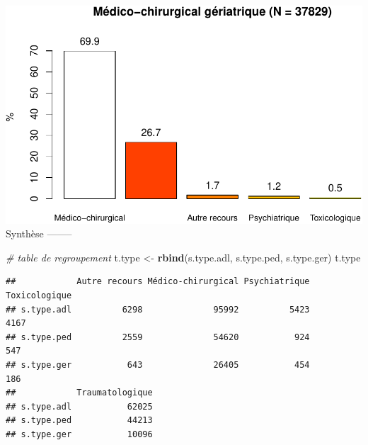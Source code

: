 \documentclass[]{article}
\newenvironment{Shaded}{\begin{snugshade}}{\end{snugshade}}
\newcommand{\KeywordTok}[1]{\textcolor[rgb]{0.13,0.29,0.53}{\textbf{{#1}}}}
\newcommand{\DataTypeTok}[1]{\textcolor[rgb]{0.13,0.29,0.53}{{#1}}}
\newcommand{\FloatTok}[1]{\textcolor[rgb]{0.00,0.00,0.81}{{#1}}}
\newcommand{\StringTok}[1]{\textcolor[rgb]{0.31,0.60,0.02}{{#1}}}
\newcommand{\CommentTok}[1]{\textcolor[rgb]{0.56,0.35,0.01}{\textit{{#1}}}}
\newcommand{\OtherTok}[1]{\textcolor[rgb]{0.56,0.35,0.01}{{#1}}}
\newcommand{\NormalTok}[1]{{#1}}
\begin{document}
\begin{Shaded}
\end{Shaded}

\includegraphics{analyse_merge_files/figure-latex/geriatrie-2.pdf}\\
Synthèse --------

\begin{Shaded}
\begin{Highlighting}[]
\CommentTok{# table de regroupement}
\NormalTok{t.type <-}\StringTok{ }\KeywordTok{rbind}\NormalTok{(s.type.adl, s.type.ped, s.type.ger)}
\NormalTok{t.type}
\end{Highlighting}
\end{Shaded}

\begin{verbatim}
##            Autre recours Médico-chirurgical Psychiatrique Toxicologique
## s.type.adl          6298              95992          5423          4167
## s.type.ped          2559              54620           924           547
## s.type.ger           643              26405           454           186
##            Traumatologique
## s.type.adl           62025
## s.type.ped           44213
## s.type.ger           10096
\end{verbatim}
\end{document}
